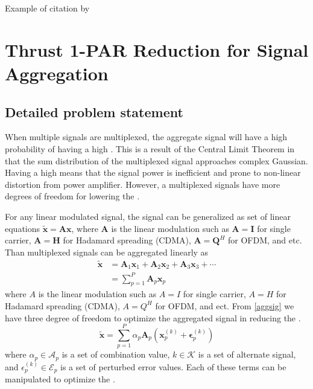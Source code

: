 \documentclass[11pt,onecolumn]{IEEEtran}
\begin{document}
Example of citation by \cite{postema87}
\section{Thrust 1-PAR Reduction for Signal Aggregation}
\subsection{Detailed problem statement}

When multiple signals are multiplexed, the aggregate signal will have a high probability of having a high \PAR.  This is a result of the Central Limit Theorem in that the sum distribution of the multiplexed signal approaches complex Gaussian.  Having a high \PAR means that the signal power is inefficient and prone to non-linear distortion from power amplifier.  However, a multiplexed signals have more degrees of freedom for lowering the \PAR.

For any linear modulated signal, the signal can be generalized as set of linear equations $\mathbf{\tilde{x}}=\mathbf{Ax}$, where $\mathbf{A}$ is the linear modulation such as $\mathbf{A}=\mathbf{I}$ for single carrier, $\mathbf{A}=\mathbf{H}$ for Hadamard spreading (CDMA), $\mathbf{A}=\mathbf{Q}^H$ for OFDM, and etc.  Than multiplexed signals can be aggregated linearly as
\begin{equation}
\begin{aligned}
\mathbf{\tilde{x}}&=\mathbf{A}_1\mathbf{x}_1+\mathbf{A}_2\mathbf{x}_2+\mathbf{A}_3\mathbf{x}_3+\cdots\\
&=\sum_{p=1}^P\mathbf{A}_p\mathbf{x}_p
\end{aligned}
\label{aggsig}
\end{equation}
where $A$ is the linear modulation such as $A=I$ for single carrier, $A=H$ for Hadamard spreading (CDMA), $A=Q^H$ for OFDM, and ect.
From \eqref{aggsig} we have three degree of freedom to optimize the aggregated signal in reducing the \PAR.  
\begin{equation}
{\mathbf{\tilde{x}}}=\sum_{p=1}^P\alpha_p\mathbf{A}_p\left(\mathbf{x}_p^{(k)}+\mathbf{\epsilon}_p^{(k)}\right)
\label{xGen}
\end{equation}
where $\alpha_p\in\mathcal{A}_p$ is a set of combination value, $k\in \mathcal{K}$ is a set of alternate signal, and $\epsilon_p^{(k)}\in\mathcal{E}_p$ is a set of perturbed error values.  Each of these terms can be manipulated to optimize the \PAR.
\end{document}
